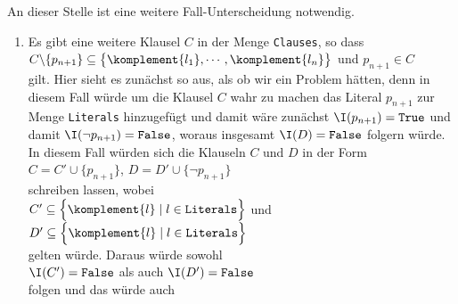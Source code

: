 \begin{enumerate}
\begin{enumerate}
                   An dieser Stelle ist eine weitere Fall-Unterscheidung notwendig.
                   \begin{enumerate}
                   \item Es gibt eine weitere Klausel $C$ in der Menge \texttt{Clauses}, so dass
                         \\[0.2cm]
                         \hspace*{1.3cm}
                         $C \backslash \{ p_{n+1} \} \subseteq \bigl\{ \komplement{l_1}, \cdots,
                         \komplement{l_n} \bigr\}$ \quad und \quad $p_{n+1} \in C$
                         \\[0.2cm]
                         gilt.  Hier sieht es zunächst so aus, als ob wir ein Problem hätten, denn
                         in diesem Fall würde um die Klausel $C$ wahr zu machen das Literal $p_{n+1}$ zur Menge
                         \texttt{Literals} hinzugefügt und damit wäre zunächst $\I(p_{n+1}) = \texttt{True}$ 
                         und damit $\I(\neg p_{n+1}) = \texttt{False}$, woraus insgesamt 
                         $\I(D) = \texttt{False}$ folgern würde.  In diesem Fall würden sich
                         die Klauseln $C$ und $D$  in der Form
                         \\[0.2cm]
                         \hspace*{1.3cm}
                         $C = C' \cup \{p_{n+1}\}$, \quad $D = D' \cup \{ \neg p_{n+1} \}$
                         \\[0.2cm]
                         schreiben lassen, wobei 
                         \\[0.2cm]
                         \hspace*{1.3cm}
                         $C' \subseteq \Bigl\{ \komplement{l} \mid l \in \texttt{Literals} \Bigr\}$  \quad und \quad
                         $D' \subseteq \Bigl\{ \komplement{l} \mid l \in \texttt{Literals} \Bigr\}$
                         \\[0.2cm]
                         gelten würde.  Daraus würde sowohl
                         \\[0.2cm]
                         \hspace*{1.3cm}
                         $\I(C') = \texttt{False}$ \quad als auch \quad $\I(D') = \texttt{False}$
                         \\[0.2cm]
                         folgen und das würde auch
                         \\[0.2cm]

\end{enumerate}
\end{enumerate}
\end{enumerate}
